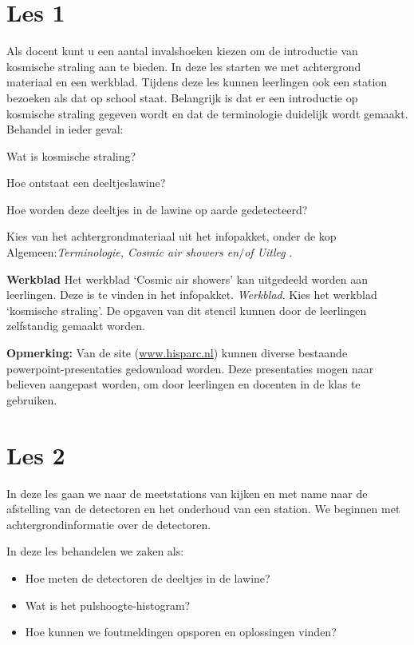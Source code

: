 \section{Les 1}

Als docent kunt u een aantal invalshoeken kiezen om de introductie van
kosmische straling aan te bieden.  In deze les starten we met
achtergrond materiaal en een werkblad. Tijdens deze les kunnen
leerlingen ook een station bezoeken als dat op school staat. Belangrijk
is dat er een introductie op kosmische straling gegeven wordt en dat de
terminologie duidelijk wordt gemaakt.
Behandel in ieder geval:
\begin{description}
    \item{Wat is kosmische straling?}
    \item{Hoe ontstaat een deeltjeslawine?}
    \item{Hoe worden deze deeltjes in de lawine op aarde gedetecteerd?}
\end{description}
Kies van het achtergrondmateriaal uit het infopakket, onder de kop
Algemeen:\textit{Terminologie, Cosmic air showers en$/$of Uitleg \hisparc}.

\textbf{Werkblad} Het werkblad `Cosmic air showers' kan uitgedeeld worden aan 
leerlingen. Deze is te vinden in het infopakket.
\textit{Werkblad}. Kies het werkblad `kosmische straling'.
De opgaven van dit stencil kunnen door de leerlingen zelfstandig gemaakt worden.

\textbf{Opmerking:}
Van de \hisparc site (\url{www.hisparc.nl}) kunnen diverse bestaande powerpoint-presentaties 
gedownload worden.
Deze presentaties mogen naar believen aangepast worden, om door leerlingen en docenten 
in de klas te gebruiken.

\section{Les 2}
In deze les gaan we naar de meetstations van \hisparc kijken en met name naar de 
afstelling van de detectoren en het onderhoud van een station.
We beginnen met achtergrondinformatie over de detectoren.

In deze les behandelen we zaken als:
\begin{itemize}
    \item Hoe meten de detectoren de deeltjes in de lawine?
    \item Wat is het pulshoogte-histogram?
    \item Hoe kunnen we foutmeldingen opsporen en oplossingen vinden?
\end{itemize}

